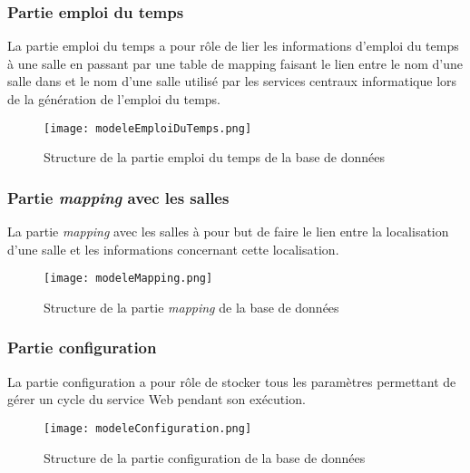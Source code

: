 \begin{appendices}
\subsubsection{Partie emploi du temps}

La partie emploi du temps a pour r\^ole de lier les informations d'emploi du temps \`a une salle en passant par une table de mapping faisant le lien entre le nom d'une salle dans {\YuukouII} et le nom d'une salle utilis\'e par les services centraux informatique lors de la g\'en\'eration de l'emploi du temps.

\clearpage

\begin{figure}[!ht]
	\centering
	\texttt{[image: modeleEmploiDuTemps.png]}
	\caption{Structure de la partie emploi du temps de la base de donn\'ees}
	\label{annexe:modeleEmploiDuTemps}

\end{figure}

\subsubsection{Partie \textit{mapping} avec les salles}

La partie \textit{mapping} avec les salles \`a pour but de faire le lien entre la localisation d'une salle et les informations concernant cette localisation.

\begin{figure}[!ht]
	\centering
	\texttt{[image: modeleMapping.png]}
	\caption{Structure de la partie \textit{mapping} de la base de donn\'ees}
	\label{annexemodeleMapping}

\end{figure}

\subsubsection{Partie configuration}

La partie configuration a pour r\^ole de stocker tous les param\`etres permettant de g\'erer un cycle du service Web pendant son ex\'ecution.

\begin{figure}[!ht]
	\centering
	\texttt{[image: modeleConfiguration.png]}
	\caption{Structure de la partie configuration de la base de donn\'ees}
	\label{annexe:modeleConfiguration}

\end{figure}


\end{appendices}

\clearpage
